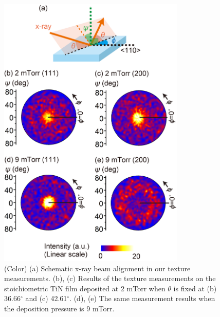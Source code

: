 \begin{figure}
\begin{center}
\includegraphics[width=89mm]{Texture.jpg}
\end{center}
\caption{(Color) (a) Schematic x-ray beam alignment in our texture measurements. (b), (c) Results of the texture measurements on the stoichiometric TiN film deposited at 2 mTorr when $\theta$ is fixed at (b) 36.66$^{\circ}$ and (c) 42.61$^{\circ}$. (d), (e) The same measurement results when the deposition pressure is 9 mTorr.}
\label{Texture}
\end{figure}

